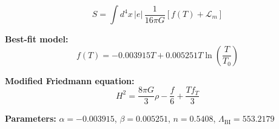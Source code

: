 
\begin{equation}
  S = \int d^4x \, |e| \, \frac{1}{16\pi G} \left[ f(T) + \mathcal{L}_m \right]
\end{equation}

\textbf{Best-fit model:}
\begin{equation}
  f(T) = -0.003915 T + 0.005251 T \ln\!\left(\frac{T}{T_0}\right)
\end{equation}

\textbf{Modified Friedmann equation:}
\begin{equation}
  H^2 = \frac{8\pi G}{3} \rho - \frac{f}{6} + \frac{T f_T}{3}
\end{equation}

\textbf{Parameters:}
$\alpha = -0.003915$, \quad
$\beta = 0.005251$, \quad
$n = 0.5408$, \quad
$\Lambda_{\text{BI}} = 553.2179$